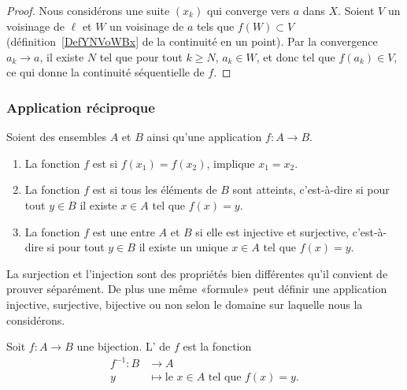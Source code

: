 \begin{proof}
	Nous considérons une suite \( (x_k)\) qui converge vers \( a\) dans \( X\). Soient \( V\) un voisinage de \( \ell \) et \( W\) un voisinage de \( a\) tels que \( f(W)\subset V\) (définition~\ref{DefYNVoWBx} de la continuité en un point). Par la convergence \( a_k\to a\),  il existe \( N\) tel que pour tout \( k\geq N\), \( a_k\in W\), et donc tel que \( f(a_k)\in V\), ce qui donne la continuité séquentielle de \( f\).
\end{proof}


\subsubsection{Application réciproque}

\begin{definition}        \label{DEFooBFCQooPyKvRK}
	Soient des ensembles \( A\) et \( B\) ainsi qu'une application \( f\colon A\to B\).
	\begin{enumerate}
		\item
		      La fonction \( f\) est  si \( f(x_1)=f(x_2)\), implique \( x_1=x_2\).
		\item
		      La fonction \( f\) est  si tous les éléments de \( B\) sont atteints, c'est-à-dire si pour tout \( y\in B\) il existe \( x\in A\) tel que \( f(x)=y\).
		\item
		      La fonction \( f\) est une  entre \( A\) et \( B\) si elle est injective et surjective, c'est-à-dire si pour tout \( y\in B\) il existe un unique \( x\in A\) tel que \( f(x)=y\).
	\end{enumerate}
\end{definition}
La surjection et l'injection sont des propriétés bien différentes qu'il convient de prouver séparément. De plus une même «formule» peut définir une application injective, surjective, bijective ou non selon le domaine sur laquelle nous la considérons.

\begin{definition}      \label{DEFooTRGYooRxORpY}
	Soit \( f\colon A\to B\) une bijection. L' de \( f\) est la fonction
	\begin{equation}
		\begin{aligned}
			f^{-1}\colon B & \to A                                             \\
			y              & \mapsto \text{le } x\in A\text{ tel que } f(x)=y.
		\end{aligned}
	\end{equation}
\end{definition}

